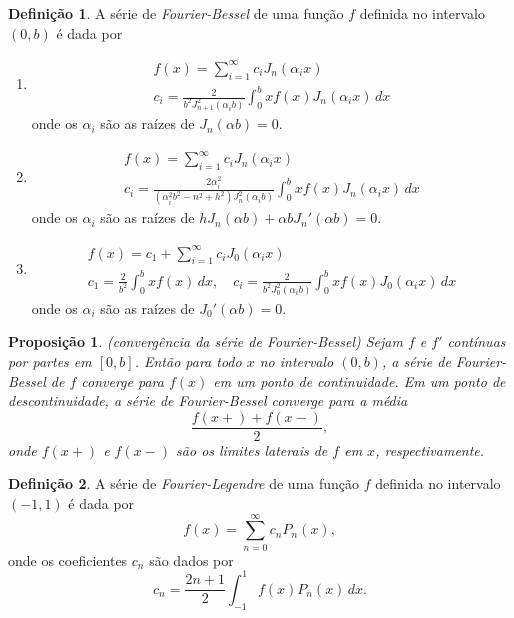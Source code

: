 \documentclass[12pt]{article}
\theoremstyle{plain}
\newtheorem{prop}[thm]{Proposição}
\theoremstyle{definition}
\newtheorem{defn}{Definição}[section]
\theoremstyle{remark}
\begin{document}
\begin{defn}
    A série de \emph{Fourier-Bessel} de uma função \(f\) definida no intervalo \((0,b)\) é dada por
    \begin{enumerate}
        \item [(i)] \begin{gather}
            f(x) = \sum_{i=1}^{\infty} c_i J_n(\alpha_{i}x) \\
            c_i = \frac{2}{b^2 J_{n+1}^2(\alpha_i b)} \int_0^b x f(x) J_n(\alpha_i x) \, dx
        \end{gather}
        \noindent onde os \(\alpha_i\) são as raízes de \(J_n(\alpha b) = 0\).
        \item [(ii)] \begin{gather}
            f(x) = \sum_{i=1}^{\infty} c_i J_n(\alpha_{i}x) \\
            c_i = \frac{2\alpha_{i}^2}{(\alpha_{i}^2 b^2 - n^2 + h^2)J_n^2(\alpha_i b)} \int_0^b x f(x) J_n(\alpha_i x) \, dx
        \end{gather}
        \noindent onde os \(\alpha_i\) são as raízes de \(h J_n(\alpha b) + \alpha b J_n'(\alpha b) = 0\).
        \item [(iii)] \begin{gather}
            f(x) = c_1 + \sum_{i=1}^{\infty} c_i J_0(\alpha_{i}x) \\
            c_1 = \frac{2}{b^2} \int_0^b x f(x) \, dx, \quad c_i = \frac{2}{b^2 J_0^2(\alpha_i b)} \int_0^b x f(x) J_0(\alpha_i x) \, dx
        \end{gather}
        \noindent onde os \(\alpha_i\) são as raízes de \(J_0'(\alpha b) = 0\).
    \end{enumerate}
\end{defn}

\begin{prop} (convergência da série de Fourier-Bessel)
    Sejam \(f\) e \(f'\) contínuas por partes em \([0,b]\). Então para todo \(x\) no intervalo \((0,b)\), a série de Fourier-Bessel de \(f\) converge para \(f(x)\) em um ponto de continuidade. Em um ponto de descontinuidade, a série de Fourier-Bessel converge para a média
    \begin{equation*}
        \frac{f(x+) + f(x-)}{2},
    \end{equation*}
    \noindent onde \(f(x+)\) e \(f(x-)\) são os limites laterais de \(f\) em \(x\), respectivamente.
\end{prop}

\begin{defn}
    A série de \emph{Fourier-Legendre} de uma função \(f\) definida no intervalo \((-1,1)\) é dada por
    \begin{equation}
        f(x) = \sum_{n=0}^{\infty} c_n P_n(x),
    \end{equation}
    \noindent onde os coeficientes \(c_n\) são dados por
    \begin{equation}
        c_n = \frac{2n+1}{2} \int_{-1}^{1} f(x) P_n(x) \, dx.
\end{equation}
\end{defn}
\end{document}
